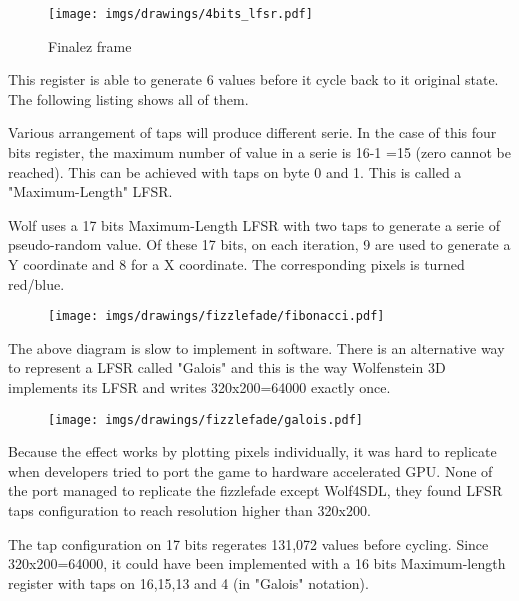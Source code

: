 \begin{figure}[H]
 \centering
  \texttt{[image: imgs/drawings/4bits\_lfsr.pdf]}
 \caption{Finalez frame} 
\end{figure}
This register is able to generate 6 values before it cycle back to it original state. The following listing shows all of them.\\
\par
\begin{minipage}{\textwidth}

\end{minipage}
\par
Various arrangement of taps will produce different serie. In the case of this four bits register, the maximum number of value in a serie is 16-1 =15 (zero cannot be reached). This can be achieved with taps on byte 0 and 1. This is called a "Maximum-Length" LFSR.\\
\par
\begin{minipage}{\textwidth}

\end{minipage}
\par
\par
Wolf uses a 17 bits Maximum-Length LFSR with two taps to generate a serie of pseudo-random value. Of these 17 bits, on each iteration, 9 are used to generate a Y coordinate and 8 for a X coordinate. The corresponding pixels is turned red/blue.\\
\par
\begin{figure}[H] \centering \texttt{[image: imgs/drawings/fizzlefade/fibonacci.pdf]} \end{figure}
\par
The above diagram is slow to implement in software. There is an alternative way to represent a LFSR called "Galois" and this is the way Wolfenstein 3D implements its LFSR and writes 320x200=64000 exactly once.
\par
\begin{figure}[H] \centering \texttt{[image: imgs/drawings/fizzlefade/galois.pdf]} \end{figure}
      
 Because the effect works by plotting pixels individually, it was hard to replicate when developers tried to port the game to hardware accelerated GPU. None of the port managed to replicate the fizzlefade except Wolf4SDL, they found LFSR taps configuration to reach resolution higher than 320x200.\\
\par
{} The tap configuration on 17 bits regerates 131,072 values before cycling. Since 320x200=64000, it could have been implemented with a 16 bits Maximum-length register with taps on 16,15,13 and 4 (in "Galois" notation).










